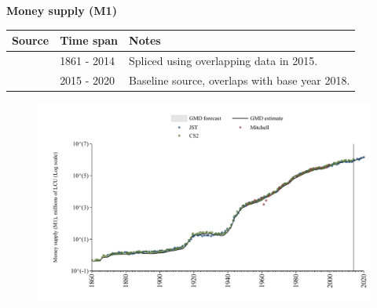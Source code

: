 \documentclass[12pt,a4paper,landscape]{article}
\begin{document}
\begin{adjustbox}{max totalsize={\paperwidth}{\paperheight},center}
\begin{minipage}[t][\textheight][t]{\textwidth}
\vspace*{0.5cm}
{}
\begin{center}
{\Large\bfseries Money supply (M1)}
\end{center}
\vspace{0.5cm}
\begin{table}[H]
\centering
\small
\begin{tabular}{|l|l|l|}
\hline
\textbf{Source} & \textbf{Time span} & \textbf{Notes} \\
\hline
\rowcolor{white}\cite{CS2_ITA}& 1861 - 2014 &Spliced using overlapping data in 2015. \\
\rowcolor{lightgray}\cite{JST}& 2015 - 2020 &Baseline source, overlaps with base year 2018. \\
\hline
\end{tabular}
\end{table}
\begin{figure}[H]
\centering
\includegraphics[width=\textwidth,height=0.6\textheight,keepaspectratio]{graphs/ITA_M1.pdf}
\end{figure}
\end{minipage}
\end{adjustbox}
\end{document}
